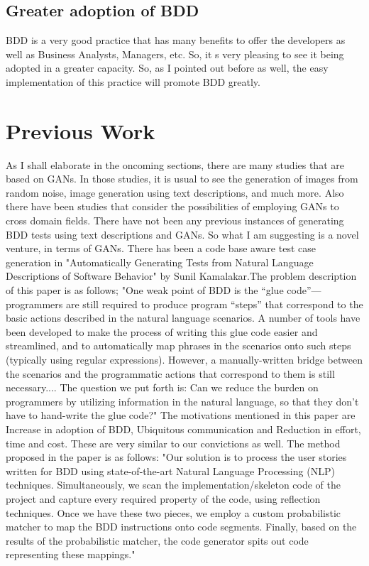 \documentclass[conference]{IEEEtran}
\begin{document}
\subsection{Greater adoption of BDD}
BDD is a very good practice that has many benefits to offer the developers as well as Business Analysts, Managers, etc. So, it s very pleasing to see it being adopted in a greater capacity. So, as I pointed out before as well, the easy implementation of this practice will promote BDD greatly.


\section{Previous Work}
As I shall elaborate in the oncoming sections, there are many studies that are based on GANs. In those studies, it is usual to see the generation of images from random noise, \cite{b2} image generation using text descriptions, \cite{b5} and much more. Also there have been studies that consider the possibilities of employing GANs to cross domain fields.\cite{b3}\newline
There have not been any previous instances of generating BDD tests using text descriptions and GANs. So what I am suggesting is a novel venture, in terms of GANs.
There has been a code base aware test case generation in "Automatically Generating Tests from Natural Language Descriptions of Software Behavior" by Sunil Kamalakar.The problem description of this paper is as follows; "One weak point of BDD is the “glue code”—programmers are still required to produce
program “steps” that correspond to the basic actions described in the natural language scenarios. A number of tools have been developed to make the process of writing this glue code easier and streamlined, and to automatically map phrases in the scenarios onto such steps (typically using regular expressions). However, a manually-written bridge between the scenarios and the programmatic actions that correspond to them is still necessary.... The question we put forth is: Can we reduce the burden on programmers by utilizing information in the natural language, so that they don’t have to hand-write the glue code?"\cite{a2} 
The motivations mentioned in this paper are Increase in adoption of BDD, Ubiquitous communication and Reduction in eﬀort, time and cost. These are very similar to our convictions as well.
The method proposed in the paper is as follows: "Our solution is to process the user stories written for BDD using state-of-the-art Natural Language Processing (NLP) techniques. Simultaneously, we scan the implementation/skeleton code of the project and capture every required property of the code, using reﬂection techniques. Once we have these two pieces, we employ a custom probabilistic matcher to map the BDD instructions onto code segments. Finally, based on the results of the probabilistic matcher, the code generator spits out code representing these mappings."\cite{a2}
\end{document}
